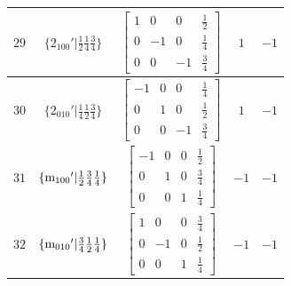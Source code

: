 \documentclass[fleqn,8pt]{jsarticle}
\begin{document}
\begin{longtable}{ccccc}
$ 29 $ & $ \{2{}_{100}{}'|\frac{1}{2} \frac{1}{4} \frac{3}{4}\} $ & $ \begin{bmatrix} 1 & 0 & 0 & \frac{1}{2} \\ 0 & -1 & 0 & \frac{1}{4} \\ 0 & 0 & -1 & \frac{3}{4} \end{bmatrix} $ & $ 1 $ & $ -1 $ \\ \hline
$ 30 $ & $ \{2{}_{010}{}'|\frac{1}{4} \frac{1}{2} \frac{3}{4}\} $ & $ \begin{bmatrix} -1 & 0 & 0 & \frac{1}{4} \\ 0 & 1 & 0 & \frac{1}{2} \\ 0 & 0 & -1 & \frac{3}{4} \end{bmatrix} $ & $ 1 $ & $ -1 $ \\ \hline
$ 31 $ & $ \{{\rm m}_{100}{}'|\frac{1}{2} \frac{3}{4} \frac{1}{4}\} $ & $ \begin{bmatrix} -1 & 0 & 0 & \frac{1}{2} \\ 0 & 1 & 0 & \frac{3}{4} \\ 0 & 0 & 1 & \frac{1}{4} \end{bmatrix} $ & $ -1 $ & $ -1 $ \\ \hline
$ 32 $ & $ \{{\rm m}_{010}{}'|\frac{3}{4} \frac{1}{2} \frac{1}{4}\} $ & $ \begin{bmatrix} 1 & 0 & 0 & \frac{3}{4} \\ 0 & -1 & 0 & \frac{1}{2} \\ 0 & 0 & 1 & \frac{1}{4} \end{bmatrix} $ & $ -1 $ & $ -1 $ \\
\end{longtable}
\end{document}
